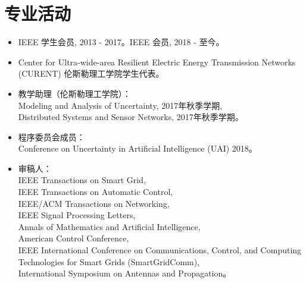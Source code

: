 \documentclass{resume}
\begin{document}
\section{专业活动}
\begin{itemize}
	\item IEEE 学生会员, 2013 - 2017。IEEE 会员, 2018 - 至今。
	\item  Center for Ultra-wide-area Resilient Electric Energy Transmission Networks (CURENT) 伦斯勒理工学院学生代表。
	\item 教学助理（伦斯勒理工学院）：\\
	Modeling and Analysis of Uncertainty, 2017年秋季学期, \\
	Distributed Systems and Sensor Networks, 2017年秋季学期。
	\item 程序委员会成员：\\
	Conference on Uncertainty in Artificial Intelligence (UAI) 2018。
	\item 审稿人：\\
	IEEE Transactions on Smart Grid, \\
	IEEE Transactions on Automatic Control, \\
	IEEE/ACM Transactions on Networking, \\
	IEEE Signal Processing Letters, \\
	Annals of Mathematics and Artificial Intelligence, \\
	American Control Conference, \\
	IEEE International Conference on Communications, Control, and Computing Technologies
	for Smart Grids (SmartGridComm), \\
	International Symposium on Antennas and Propagation。
\end{itemize}


%
%
\end{document}
